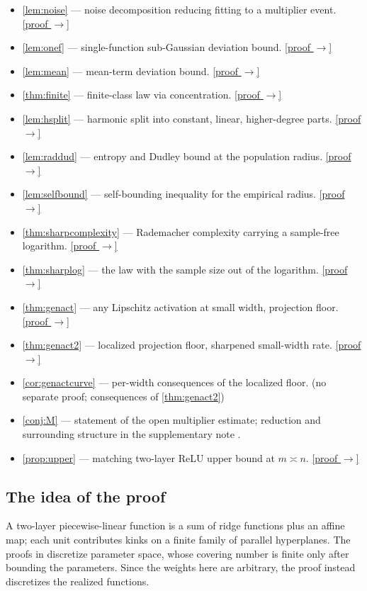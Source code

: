 \documentclass[11pt,reqno]{amsart}
\theoremstyle{plain}
\theoremstyle{definition}
\theoremstyle{remark}
\newcommand{\proofbutton}[1]{\hyperref[proof:#1]{\textnormal{\footnotesize\textsf{[proof $\to$]}}}}
\begin{document}
\begin{itemize}
\item \ref{lem:noise} --- noise decomposition reducing fitting to a multiplier event. \proofbutton{noise}
\item \ref{lem:onef} --- single-function sub-Gaussian deviation bound. \proofbutton{onef}
\item \ref{lem:mean} --- mean-term deviation bound. \proofbutton{mean}
\item \ref{thm:finite} --- finite-class law via concentration. \proofbutton{finite}
\item \ref{lem:hsplit} --- harmonic split into constant, linear, higher-degree parts. \proofbutton{hsplit}
\item \ref{lem:raddud} --- entropy and Dudley bound at the population radius. \proofbutton{raddud}
\item \ref{lem:selfbound} --- self-bounding inequality for the empirical radius. \proofbutton{selfbound}
\item \ref{thm:sharpcomplexity} --- Rademacher complexity carrying a sample-free logarithm. \proofbutton{sharpcomplexity}
\item \ref{thm:sharplog} --- the law with the sample size out of the logarithm. \proofbutton{sharplog}
\item \ref{thm:genact} --- any Lipschitz activation at small width, projection floor. \proofbutton{genact}
\item \ref{thm:genact2} --- localized projection floor, sharpened small-width rate. \proofbutton{genact2}
\item \ref{cor:genactcurve} --- per-width consequences of the localized floor. (no separate proof; consequences of \ref{thm:genact2})
\item \ref{conj:M} --- statement of the open multiplier estimate; reduction and surrounding structure in the supplementary note \cite{supp}.
\item \ref{prop:upper} --- matching two-layer ReLU upper bound at $m\asymp n$. \proofbutton{upper}
\end{itemize}

\subsection{The idea of the proof}

A two-layer piecewise-linear function is a sum of ridge functions plus an affine map; each unit contributes kinks on a finite family of parallel hyperplanes. The proofs in \cite{BLN,BS,WHZ} discretize parameter space, whose covering number is finite only after bounding the parameters. Since the weights here are arbitrary, the proof instead discretizes the realized functions.
\end{document}
